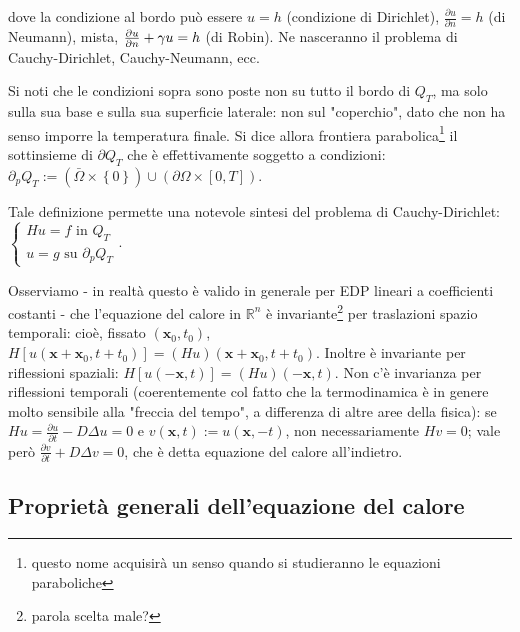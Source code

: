 \documentclass{article}
\begin{document}
dove la condizione al bordo pu\`{o} essere $u=h$ (condizione di Dirichlet), $%
\frac{\partial u}{\partial n}=h$ (di Neumann), mista, $\frac{\partial u}{%
\partial n}+\gamma u=h$ (di Robin). Ne nasceranno il problema di
Cauchy-Dirichlet, Cauchy-Neumann, ecc.

Si noti che le condizioni sopra sono poste non su tutto il bordo di $Q_{T}$,
ma solo sulla sua base e sulla sua superficie laterale: non sul "coperchio",
dato che non ha senso imporre la temperatura finale. Si dice allora
frontiera parabolica\footnote{%
questo nome acquisir\`{a} un senso quando si studieranno le equazioni
paraboliche} il sottinsieme di $\partial Q_{T}$ che \`{e} effettivamente
soggetto a condizioni: $\partial _{p}Q_{T}:=\left( \bar{\Omega}\times
\left\{ 0\right\} \right) \cup \left( \partial \Omega \times \left[ 0,T%
\right] \right) $.

Tale definizione permette una notevole sintesi del problema di
Cauchy-Dirichlet: $\left\{ 
\begin{array}{c}
Hu=f\text{ in }Q_{T} \\ 
u=g\text{ su }\partial _{p}Q_{T}%
\end{array}%
\right. $.

Osserviamo - in realt\`{a} questo \`{e} valido in generale per EDP lineari a
coefficienti costanti - che l'equazione del calore in $%
\mathbb{R}
^{n}$ \`{e} invariante\footnote{\tiny{parola scelta male?}} per traslazioni spazio
temporali: cio\`{e}, fissato $\left( \mathbf{x}_{0},t_{0}\right) $, $H\left[
u\left( \mathbf{x+x}_{0},t+t_{0}\right) \right] =\left( Hu\right) \left( 
\mathbf{x+x}_{0},t+t_{0}\right) $. Inoltre \`{e} invariante per riflessioni
spaziali: $H\left[ u\left( -\mathbf{x},t\right) \right] =\left( Hu\right)
\left( -\mathbf{x},t\right) $. Non c'\`{e} invarianza per riflessioni
temporali (coerentemente col fatto che la termodinamica \`{e} in genere
molto sensibile alla "freccia del tempo", a differenza di altre aree della
fisica): se $Hu=\frac{\partial u}{\partial t}-D\Delta u=0$ e $v\left( 
\mathbf{x},t\right) :=u\left( \mathbf{x},-t\right) $, non necessariamente $%
Hv=0$; vale per\`{o} $\frac{\partial v}{\partial t}+D\Delta v=0$, che \`{e}
detta equazione del calore all'indietro.

\subsection{Propriet\`{a} generali dell'equazione del calore}
\end{document}
